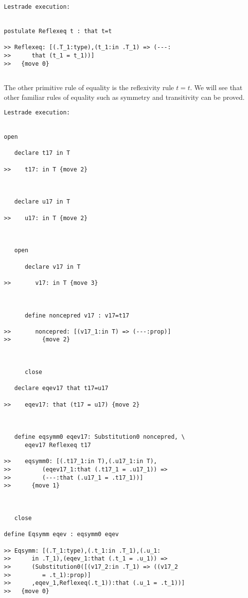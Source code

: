 \documentclass[12pt]{article}
\begin{document}
\begin{verbatim}Lestrade execution:


postulate Reflexeq t : that t=t

>> Reflexeq: [(.T_1:type),(t_1:in .T_1) => (---:
>>      that (t_1 = t_1))]
>>   {move 0}


\end{verbatim}

The other primitive rule of equality is the reflexivity rule $t=t$.  We will see that other familiar rules of equality such as symmetry and transitivity can be proved.

\begin{verbatim}Lestrade execution:


open

   declare t17 in T

>>    t17: in T {move 2}



   declare u17 in T

>>    u17: in T {move 2}



   open

      declare v17 in T

>>       v17: in T {move 3}



      define noncepred v17 : v17=t17

>>       noncepred: [(v17_1:in T) => (---:prop)]
>>         {move 2}



      close

   declare eqev17 that t17=u17

>>    eqev17: that (t17 = u17) {move 2}



   define eqsymm0 eqev17: Substitution0 noncepred, \
      eqev17 Reflexeq t17

>>    eqsymm0: [(.t17_1:in T),(.u17_1:in T),
>>         (eqev17_1:that (.t17_1 = .u17_1)) =>
>>         (---:that (.u17_1 = .t17_1))]
>>      {move 1}



   close

define Eqsymm eqev : eqsymm0 eqev

>> Eqsymm: [(.T_1:type),(.t_1:in .T_1),(.u_1:
>>      in .T_1),(eqev_1:that (.t_1 = .u_1)) =>
>>      (Substitution0([(v17_2:in .T_1) => ((v17_2
>>         = .t_1):prop)]
>>      ,eqev_1,Reflexeq(.t_1)):that (.u_1 = .t_1))]
>>   {move 0}


\end{verbatim}
\end{document}
